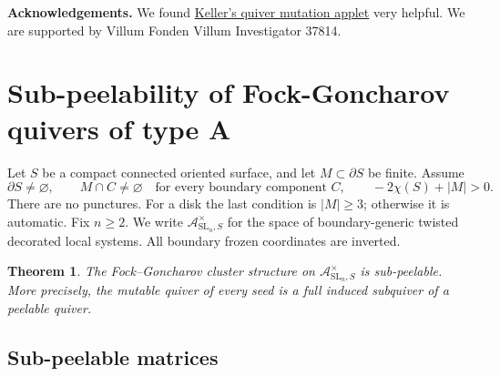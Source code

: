 \documentclass[12pt, letter]{amsart}
\newtheorem{theorem}{Theorem}[section]
\theoremstyle{definition}
\newcommand{\Ac}{\mathcal A}
\numberwithin{equation}{section}
\begin{document}
{\bf Acknowledgements.} 
We found \href{https://webusers.imj-prg.fr/~bernhard.keller/quivermutation/}{Keller's quiver mutation applet} very helpful.
We are supported by Villum Fonden Villum Investigator 37814.  



\section{Sub-peelability of Fock-Goncharov quivers of type A}
\label{sec:surface-quivers}

Let $S$ be a compact connected oriented surface, and let
$M\subset\partial S$ be finite. Assume
\begin{equation}\label{eq:surface-assumption}
 \partial S\ne\varnothing,\qquad
 M\cap C\ne\varnothing\quad\text{for every boundary component }C,
 \qquad -2\chi(S)+|M|>0.
\end{equation}
There are no punctures. For a disk the last condition is
$|M|\ge3$; otherwise it is automatic. Fix $n\ge2$.
We write $\Ac^\times_{\mathrm{SL}_n,S}$ for the space of
boundary-generic twisted decorated local systems. All boundary
frozen coordinates are inverted.

\begin{theorem}\label{thm:surface-quiver}
The Fock--Goncharov cluster structure on
$\Ac^\times_{\mathrm{SL}_n,S}$ is sub-peelable.
More precisely, the mutable quiver of every seed is a full
induced subquiver of a peelable quiver.
\end{theorem}


\subsection{Sub-peelable matrices}
\end{document}
